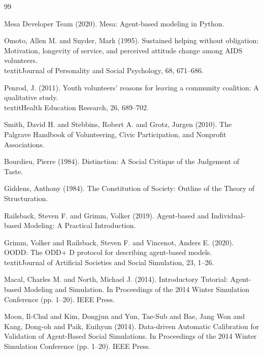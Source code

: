 \documentclass[12pt,a4paper]{article}
\begin{document}
\begin{thebibliography}{99}
\setlength{\itemsep}{0.1ex}

\item Mesa Developer Team (2020). Mesa: Agent-based modeling in Python.

\item Omoto, Allen M. and Snyder, Mark (1995). Sustained helping without obligation: Motivation, longevity of service, and perceived attitude change among AIDS volunteers. \\textit{Journal of Personality and Social Psychology}, 68, 671--686.

\item Penrod, J. (2011). Youth volunteers' reasons for leaving a community coalition: A qualitative study. \\textit{Health Education Research}, 26, 689--702.

\item Smith, David H. and Stebbins, Robert A. and Grotz, Jurgen (2010). The Palgrave Handbook of Volunteering, Civic Participation, and Nonprofit Associations.

\item Bourdieu, Pierre (1984). Distinction: A Social Critique of the Judgement of Taste.

\item Giddens, Anthony (1984). The Constitution of Society: Outline of the Theory of Structuration.

\item Railsback, Steven F. and Grimm, Volker (2019). Agent-based and Individual-based Modeling: A Practical Introduction.

\item Grimm, Volker and Railsback, Steven F. and Vincenot, Anders E. (2020). OODD: The ODD+ D protocol for describing agent-based models. \\textit{Journal of Artificial Societies and Social Simulation}, 23, 1--26.

\item Macal, Charles M. and North, Michael J. (2014). Introductory Tutorial: Agent-based Modeling and Simulation. In Proceedings of the 2014 Winter Simulation Conference (pp. 1--20). IEEE Press.

\item Moon, Il-Chul and Kim, Dongjun and Yun, Tae-Sub and Bae, Jang Won and Kang, Dong-oh and Paik, Euihyun (2014). Data-driven Automatic Calibration for Validation of Agent-Based Social Simulations. In Proceedings of the 2014 Winter Simulation Conference (pp. 1--20). IEEE Press.


\end{thebibliography}
\end{document}
